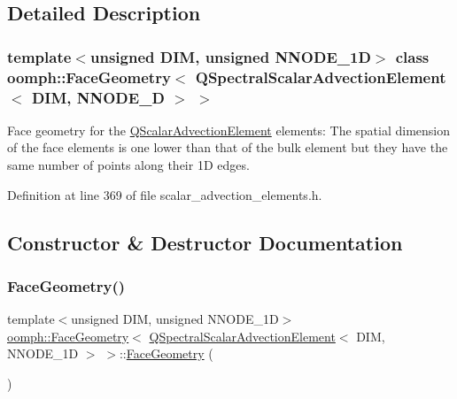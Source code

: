 \subsection{Detailed Description}
\subsubsection*{template$<$unsigned D\+IM, unsigned N\+N\+O\+D\+E\+\_\+1D$>$\newline
class oomph\+::\+Face\+Geometry$<$ Q\+Spectral\+Scalar\+Advection\+Element$<$ D\+I\+M, N\+N\+O\+D\+E\+\_\+D $>$ $>$}

Face geometry for the \hyperlink{classoomph_1_1QScalarAdvectionElement}{Q\+Scalar\+Advection\+Element} elements\+: The spatial dimension of the face elements is one lower than that of the bulk element but they have the same number of points along their 1D edges. 

Definition at line 369 of file scalar\+\_\+advection\+\_\+elements.\+h.



\subsection{Constructor \& Destructor Documentation}
\mbox{\label{classoomph_1_1FaceGeometry_3_01QSpectralScalarAdvectionElement_3_01DIM_00_01NNODE__1D_01_4_01_4_a2a40a86785381e67e1e5af8e1bbdc194}} 
\subsubsection{\texorpdfstring{Face\+Geometry()}{FaceGeometry()}}
{\footnotesize\ttfamily template$<$unsigned D\+IM, unsigned N\+N\+O\+D\+E\+\_\+1D$>$ \\
\hyperlink{classoomph_1_1FaceGeometry}{oomph\+::\+Face\+Geometry}$<$ \hyperlink{classoomph_1_1QSpectralScalarAdvectionElement}{Q\+Spectral\+Scalar\+Advection\+Element}$<$ D\+IM, N\+N\+O\+D\+E\+\_\+1D $>$ $>$\+::\hyperlink{classoomph_1_1FaceGeometry}{Face\+Geometry} (\begin{DoxyParamCaption}{ }\end{DoxyParamCaption})\hspace{0.3cm}{\ttfamily [inline]}}



